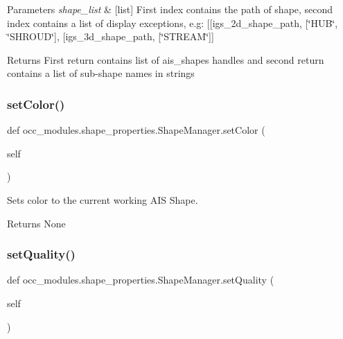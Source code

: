 \begin{DoxyParams}{Parameters}
{\em shape\+\_\+list} & \mbox{[}list\mbox{]} First index contains the path of shape, second index contains a list of display exceptions, e.\+g\+: \mbox{[}\mbox{[}igs\+\_\+2d\+\_\+shape\+\_\+path, \mbox{[}\char`\"{}\+H\+U\+B\char`\"{}, \char`\"{}\+S\+H\+R\+O\+U\+D\char`\"{}\mbox{]}, \mbox{[}igs\+\_\+3d\+\_\+shape\+\_\+path, \mbox{[}\char`\"{}\+S\+T\+R\+E\+A\+M\char`\"{}\mbox{]}\mbox{]} \\
\hline
\end{DoxyParams}
\begin{DoxyReturn}{Returns}
First return contains list of ais\+\_\+shapes handles and second return contains a list of sub-\/shape names in strings 
\end{DoxyReturn}
\hypertarget{a00095_ac659823f3085963daf751a6a94b366a7}{}\label{a00095_ac659823f3085963daf751a6a94b366a7} 
\subsubsection{\texorpdfstring{set\+Color()}{setColor()}}
{\footnotesize\ttfamily def occ\+\_\+modules.\+shape\+\_\+properties.\+Shape\+Manager.\+set\+Color (\begin{DoxyParamCaption}\item[{}]{self }\end{DoxyParamCaption})}



Sets color to the current working A\+IS Shape. 

\begin{DoxyReturn}{Returns}
None 
\end{DoxyReturn}
\hypertarget{a00095_abe8c1dbcfe98b9f86a0560dd1e8b853a}{}\label{a00095_abe8c1dbcfe98b9f86a0560dd1e8b853a} 
\subsubsection{\texorpdfstring{set\+Quality()}{setQuality()}}
{\footnotesize\ttfamily def occ\+\_\+modules.\+shape\+\_\+properties.\+Shape\+Manager.\+set\+Quality (\begin{DoxyParamCaption}\item[{}]{self }\end{DoxyParamCaption})}



